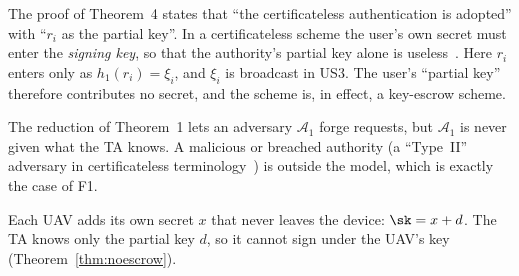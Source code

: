 \begin{remark}
The proof of Theorem~4 states that ``the certificateless authentication is adopted'' with ``$r_i$ as the partial key''. In a certificateless scheme the
user's own secret must enter the \emph{signing key}, so that the authority's partial key alone is useless~\cite{alriyami}. Here $r_i$ enters only as
$h_1(r_i)=\xi_i$, and $\xi_i$ is broadcast in US3. The user's ``partial key'' therefore contributes no secret, and the scheme is, in effect, a
key-escrow scheme.
\end{remark}

\begin{remark}
The reduction of Theorem~1 lets an adversary $\mathcal A_1$ forge requests, but $\mathcal A_1$ is never given what the TA knows. A malicious or
breached authority (a ``Type~II'' adversary in certificateless terminology~\cite{alriyami}) is outside the model, which is exactly the case of F1.
\end{remark}


\begin{fixbox}[title={How C1 removes F1 (Chapter~\ref*{ch:c1})}]
Each UAV adds its own secret $x$ that never leaves the device: $\sk=x+d$. The TA knows only the partial key $d$, so it cannot sign under the UAV's
key (Theorem~\ref{thm:noescrow}).
\end{fixbox}
